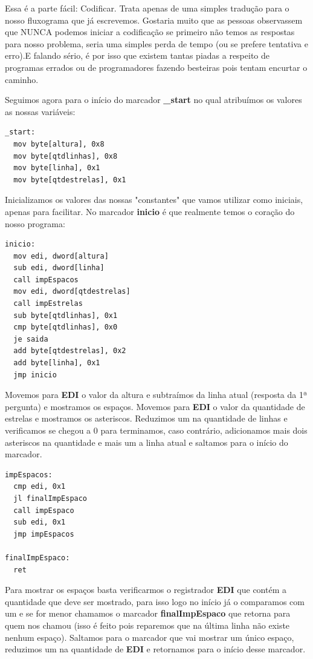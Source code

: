 Essa é a parte fácil: Codificar. Trata apenas de uma simples tradução para o nosso fluxograma que já escrevemos. Gostaria muito que as pessoas observassem que NUNCA podemos iniciar a codificação se primeiro não temos as respostas para nosso problema, seria uma simples perda de tempo (ou se prefere tentativa e erro).E falando sério, é por isso que existem tantas piadas a respeito de programas errados ou de programadores fazendo besteiras pois tentam encurtar o caminho.

Seguimos agora para o início do marcador \textbf{\_start} no qual atribuímos os valores as nossas variáveis:
\begin{lstlisting}[]
_start:
  mov byte[altura], 0x8
  mov byte[qtdlinhas], 0x8
  mov byte[linha], 0x1
  mov byte[qtdestrelas], 0x1
\end{lstlisting}

Inicializamos os valores das nossas "constantes" que vamos utilizar como iniciais, apenas para facilitar. No marcador \textbf{inicio} é que realmente temos o coração do nosso programa:
\begin{lstlisting}[]
inicio:
  mov edi, dword[altura]
  sub edi, dword[linha]
  call impEspacos
  mov edi, dword[qtdestrelas]
  call impEstrelas
  sub byte[qtdlinhas], 0x1
  cmp byte[qtdlinhas], 0x0
  je saida
  add byte[qtdestrelas], 0x2
  add byte[linha], 0x1
  jmp inicio	
\end{lstlisting}

Movemos para \textbf{EDI} o valor da altura e subtraímos da linha atual (resposta da 1ª pergunta) e mostramos os espaços. Movemos para \textbf{EDI} o valor da quantidade de estrelas e mostramos os asteriscos. Reduzimos um na quantidade de linhas e verificamos se chegou a 0 para terminamos, caso contrário, adicionamos mais dois asteriscos na quantidade e mais um a linha atual e saltamos para o início do marcador.

\begin{lstlisting}[]
impEspacos:
  cmp edi, 0x1
  jl finalImpEspaco
  call impEspaco
  sub edi, 0x1
  jmp impEspacos
  
finalImpEspaco:
  ret  	
\end{lstlisting}

Para mostrar os espaços basta verificarmos o registrador \textbf{EDI} que contém a quantidade que deve ser mostrado, para isso logo no início já o comparamos com um e se for menor chamamos o marcador \textbf{finalImpEspaco} que retorna para quem nos chamou (isso é feito pois reparemos que na última linha não existe nenhum espaço). Saltamos para o marcador que vai mostrar um único espaço, reduzimos um na quantidade de \textbf{EDI} e retornamos para o início desse marcador.

